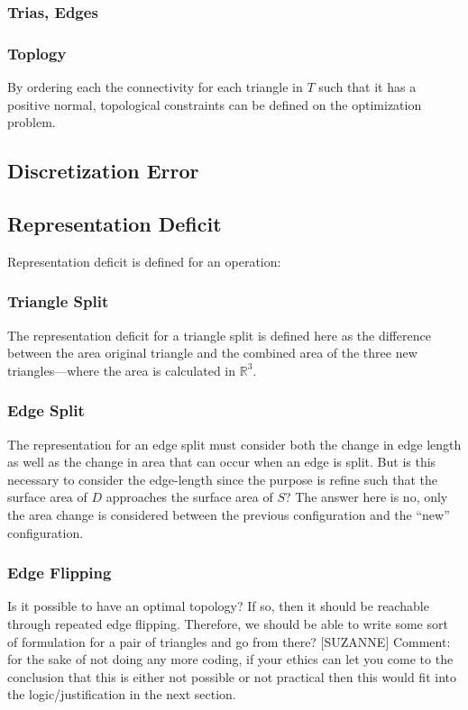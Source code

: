 \documentclass[11pt]{article}
\begin{document}
\subsubsection{Trias, Edges}
\subsubsection{Toplogy}
By ordering each the connectivity for each triangle in $T$ such that it
has a positive normal, topological constraints can be defined on the
optimization problem.
\subsection{Discretization Error}
\subsection{Representation Deficit}
Representation deficit is defined for an operation:
\subsubsection{Triangle Split}
The representation deficit for a triangle split is defined here as the
difference between the area original triangle and the combined area of
the three new triangles---where the area is calculated in ${\mathbb
R}^3$.
\subsubsection{Edge Split}
The representation for an edge split must consider both the change in
edge length as well as the change in area that can occur when an edge is
split. But is this necessary to consider the edge-length since the
purpose is refine such that the surface area of $D$ approaches the
surface area of $S$? The answer here is no, only the area change is
considered between the previous configuration and the ``new''
configuration.
\subsubsection{Edge Flipping}
Is it possible to have an optimal topology? If so, then it should be
reachable through repeated edge flipping. Therefore, we should be able
to write some sort of formulation for a pair of triangles and go from
there? [SUZANNE] Comment: for the sake of not doing any more coding, if
your ethics can let you come to the conclusion that this is either not
possible or not practical then this would fit into the
logic/justification in the next section.
\end{document}

